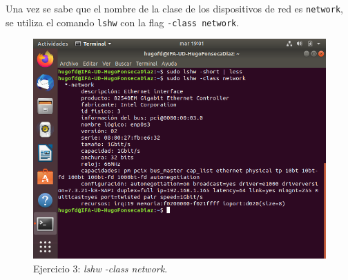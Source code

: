 \documentclass[11pt]{article}
\begin{document}
Una vez se sabe que el nombre de la clase de los dispositivos de red es \verb|network|, se utiliza el comando \verb|lshw| con la flag \verb|-class network|.
\begin{figure}[h!]
    \caption{Ejercicio 3: \textit{lshw -class network}.}
  \centering
  \includegraphics{e3-2.png}
\end{figure}
\end{document}

